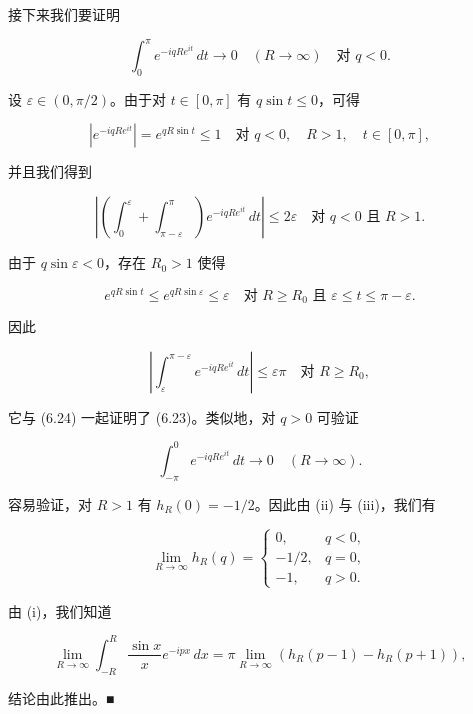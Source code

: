 \begin{proposition}
\begin{subitems}
\item[（iii）]

接下来我们要证明

\begin{equation}
\int_{0}^{\pi}e^{-iqRe^{it}}\,dt \to 0 \quad (R \to \infty) \quad \text{对 } q < 0 .\tag{6.23}
\end{equation}

设 $ \varepsilon \in (0,\pi/2) $。由于对 $ t \in [0,\pi] $ 有 $ q\sin t \le 0 $，可得

\[
\left|e^{-iqRe^{it}}\right| = e^{qR\sin t} \le 1 \quad \text{对 } q < 0 , \quad R > 1 , \quad t \in [0,\pi] ,
\]

并且我们得到

\begin{equation}
\left|\left(\int_{0}^{\varepsilon} + \int_{\pi - \varepsilon}^{\pi}\right)e^{-iqRe^{it}}\,dt\right| \le 2\varepsilon \quad \text{对 } q < 0 \text{ 且 } R > 1 .\tag{6.24}
\end{equation}

由于 $ q\sin\varepsilon < 0 $，存在 $ R_{0} > 1 $ 使得

\[
e^{qR\sin t} \le e^{qR\sin\varepsilon} \le \varepsilon \quad \text{对 } R \ge R_{0} \text{ 且 } \varepsilon \le t \le \pi - \varepsilon .
\]

因此

\[
\left|\int_{\varepsilon}^{\pi - \varepsilon}e^{-iqRe^{it}}\,dt\right| \le \varepsilon\pi \quad \text{对 } R \ge R_{0} ,
\]

它与 (6.24) 一起证明了 (6.23)。类似地，对 $ q > 0 $ 可验证

\[
\int_{-\pi}^{0}e^{-iqRe^{it}}\,dt \to 0 \quad (R \to \infty) .
\]
\item[（iv）]

容易验证，对 $ R > 1 $ 有 $ h_{R}(0) = -1/2 $。因此由 (ii) 与 (iii)，我们有

\begin{equation*}
\lim_{R\to\infty}h_{R}(q) = \begin{cases} 0 , & q < 0 , \\ -1/2 , & q = 0 , \\ -1 , & q > 0 . \end{cases}
\end{equation*}

由 (i)，我们知道

\[
\lim_{R\to\infty}\int_{-R}^{R}\frac{\sin x}{x}e^{-ipx}\,dx = \pi\lim_{R\to\infty}\left(h_{R}(p - 1) - h_{R}(p + 1)\right) ,
\]

结论由此推出。\nobreak\hspace{0.35em}■

\end{subitems}

\end{proposition}

